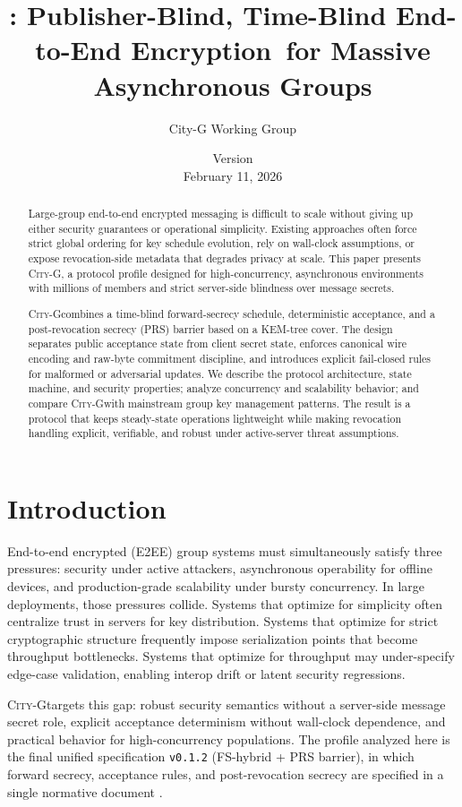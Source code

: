 \documentclass[11pt]{article}
\title{\cityg: Publisher-Blind, Time-Blind End-to-End Encryption\
for Massive Asynchronous Groups}
\author{City-G Working Group}
\date{Version \wpversion\\February 11, 2026}
\newcommand{\cityg}{\textsc{City-G}}
\begin{document}
\maketitle

\begin{abstract}
Large-group end-to-end encrypted messaging is difficult to scale without giving up either security guarantees or operational simplicity. Existing approaches often force strict global ordering for key schedule evolution, rely on wall-clock assumptions, or expose revocation-side metadata that degrades privacy at scale. This paper presents \cityg, a protocol profile designed for high-concurrency, asynchronous environments with millions of members and strict server-side blindness over message secrets.

\cityg combines a time-blind forward-secrecy schedule, deterministic acceptance, and a post-revocation secrecy (PRS) barrier based on a KEM-tree cover. The design separates public acceptance state from client secret state, enforces canonical wire encoding and raw-byte commitment discipline, and introduces explicit fail-closed rules for malformed or adversarial updates. We describe the protocol architecture, state machine, and security properties; analyze concurrency and scalability behavior; and compare \cityg with mainstream group key management patterns. The result is a protocol that keeps steady-state operations lightweight while making revocation handling explicit, verifiable, and robust under active-server threat assumptions.
\end{abstract}

\section{Introduction}
End-to-end encrypted (E2EE) group systems must simultaneously satisfy three pressures: security under active attackers, asynchronous operability for offline devices, and production-grade scalability under bursty concurrency. In large deployments, those pressures collide. Systems that optimize for simplicity often centralize trust in servers for key distribution. Systems that optimize for strict cryptographic structure frequently impose serialization points that become throughput bottlenecks. Systems that optimize for throughput may under-specify edge-case validation, enabling interop drift or latent security regressions.

\cityg targets this gap: robust security semantics without a server-side message secret role, explicit acceptance determinism without wall-clock dependence, and practical behavior for high-concurrency populations. The profile analyzed here is the final unified specification \texttt{v0.1.2} (FS-hybrid + PRS barrier), in which forward secrecy, acceptance rules, and post-revocation secrecy are specified in a single normative document \citep{citygSpec2026}.
\end{document}
